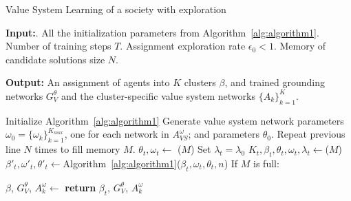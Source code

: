 \documentclass{ecai}
\begin{document}
\begin{algorithm}[H]
\caption{Value System Learning of a society with exploration}\label{alg:algorithm2}
\hspace*{\algorithmicindent} \textbf{Input:}. All the initialization parameters from Algorithm~\ref{alg:algorithm1}. Number of training steps $T$. Assignment exploration rate $\epsilon_0 < 1$. Memory of candidate solutions size $N$.


\textbf{Output:} An assignment of agents into $K$ clusters $\beta$, and trained grounding networks $G_V^\theta$ and the cluster-specific value system networks $\{A_{k}\}_{k=1}^{K}$.


 \begin{algorithmic}[1]
    \State Initialize Algorithm~\ref{alg:algorithm1}
    \State Generate value system network parameters $\omega_0 = \{\omega_{k}\}_{k=1}^{K_{max}}$, one for each network in $A_{VS}^\omega$; and parameters $\theta_0$. 
    \State Repeat previous line $N$ times to fill memory $M$.
    \State $\theta_t,\omega_t  \gets$ ($M$)
    \State Set $\lambda_t = \lambda_0$
    \Else
    \State $K_t,\beta_t,\theta_t,\omega_t,\lambda_t \gets$($M$)
    \EndIf
    \State $\beta'_{t},\omega'_{t},\theta'_t\gets$Algorithm~\ref{alg:algorithm1}($\beta_t, \omega_t,\theta_t,n$)    
    \State {}
    \State If $M$ is full: 
    \EndFor
     
 \State $\beta$, $G_V^\theta$, $A_k^\omega$$\gets$  
 \State \textbf{return} $\beta_t$, $G_V^\theta$, $A_k^\omega$
 \end{algorithmic}
\end{algorithm}
\end{document}
